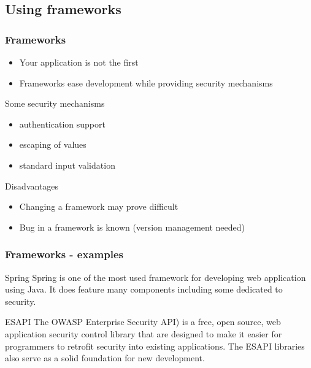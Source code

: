 \subsection{Using frameworks}

\begin{frame}
\frametitle{Frameworks}
\begin{itemize}
\item Your application is not the first
\item Frameworks ease development while providing security mechanisms
\end{itemize}
\begin{block}{Some security mechanisms}
\begin{itemize}
\item authentication support
\item escaping of values
\item standard input validation
\end{itemize}
\end{block}
\begin{block}{Disadvantages}
\begin{itemize}
\item Changing a framework may prove difficult
\item Bug in a framework is known
	(version management needed)
\end{itemize}
\end{block}
\end{frame}

\begin{frame}
\frametitle{Frameworks - examples}

\begin{exampleblock}{Spring}
Spring is one of the most used framework for developing web application using
Java. It does feature many components including some dedicated to security.
\end{exampleblock}

\begin{exampleblock}{ESAPI}
The OWASP Enterprise Security API) is a free, open source, web application
security control library that are designed to make it easier for programmers
to retrofit security into existing applications.
The ESAPI libraries also serve as a solid foundation for new development.
\end{exampleblock}

\end{frame}

